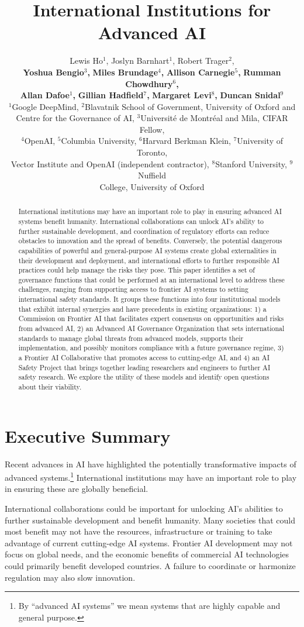 \documentclass[12pt]{article}
\title{International Institutions for Advanced AI}
\author{
Lewis Ho$^1$, 
Joslyn Barnhart$^1$,
Robert Trager$^2$,\\
\textbf{Yoshua Bengio$^3$,}
\textbf{Miles Brundage$^4$,}
\textbf{Allison Carnegie$^5$,}
\textbf{Rumman Chowdhury$^6$,}\\
\textbf{Allan Dafoe$^1$,}
\textbf{Gillian Hadfield$^7$,} 
\textbf{Margaret Levi$^8$,}
\textbf{Duncan Snidal$^9$} \vspace{10pt}\\
 $^1$Google DeepMind, $^2$Blavatnik School of Government, University of Oxford and\\
 Centre for the Governance of AI, $^3$Universit\'{e} de Montr\'{e}al and Mila, CIFAR Fellow,\\
 $^4$OpenAI, 
 $^5$Columbia University,
 $^6$Harvard Berkman Klein,
 $^7$University of Toronto,\\ Vector Institute and OpenAI (independent contractor),
 $^8$Stanford University,
 $^9$Nuffield\\ College, University of Oxford
 }
\begin{document}
\maketitle

\begin{abstract}
International institutions may have an important role to play in
ensuring advanced AI systems benefit humanity. International
collaborations can unlock AI's ability to further sustainable
development, and coordination of regulatory efforts can reduce obstacles
to innovation and the spread of benefits. Conversely, the potential
dangerous capabilities of powerful and general-purpose AI systems
create global externalities in their development and deployment, and
international efforts to further responsible AI practices could help
manage the risks they pose. This paper identifies a set of governance
functions that could be performed at an international level to address
these challenges, ranging from supporting access to frontier AI systems
to setting international safety standards. It groups these functions
into four institutional models that exhibit internal synergies and have
precedents in existing organizations: 1) a Commission on Frontier AI
that facilitates expert consensus on opportunities and risks from
advanced AI, 2) an Advanced AI Governance Organization that sets
international standards to manage global threats from advanced models,
supports their implementation, and possibly monitors compliance with a
future governance regime, 3) a Frontier AI Collaborative that promotes
access to cutting-edge AI, and 4) an AI Safety Project that brings
together leading researchers and engineers to further AI
safety research. We explore the utility of these models and identify
open questions about their viability.
\end{abstract}

\section{Executive Summary}

Recent advances in AI have highlighted the potentially transformative
impacts of advanced systems.\footnote{By ``advanced AI systems'' we mean systems that are
highly capable and general purpose.}
International institutions may have an
important role to play in ensuring these are globally beneficial.

International collaborations could be important for unlocking AI's
abilities to further sustainable development and benefit humanity. Many
societies that could most benefit may not have the resources,
infrastructure or training to take advantage of current cutting-edge AI
systems. Frontier AI development may not focus on global needs, and the
economic benefits of commercial AI technologies could primarily benefit
developed countries. A failure to coordinate or harmonize regulation may
also slow innovation.
\end{document}
